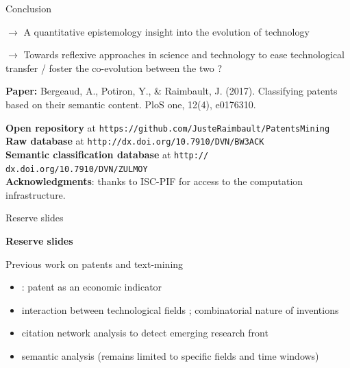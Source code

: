\documentclass{beamer}
\begin{document}
\begin{frame}{Conclusion}

$\rightarrow$ A quantitative epistemology insight into the evolution of technology

\medskip

$\rightarrow$ Towards reflexive approaches in science and technology to ease technological transfer / foster the co-evolution between the two ?


\bigskip


\textbf{Paper: } Bergeaud, A., Potiron, Y., \& Raimbault, J. (2017). Classifying patents based on their semantic content. PloS one, 12(4), e0176310.

\medskip
\textbf{Open repository} at \texttt{https://github.com/JusteRaimbault/PatentsMining}\\\medskip
\textbf{Raw database} at \texttt{http://dx.doi.org/10.7910/DVN/BW3ACK}\\\medskip 
\textbf{Semantic classification database} at  \texttt{http:// dx.doi.org/10.7910/DVN/ZULMOY}\\\medskip
\textbf{Acknowledgments}: thanks to ISC-PIF for access to the computation infrastructure.

\end{frame}


\begin{frame}{Reserve slides}
    
    \centering
    \Huge
    \textbf{Reserve slides}
    
\end{frame}

\begin{frame}{Previous work on patents and text-mining}

    \begin{itemize}
\item \cite{griliches1998patent}: patent as an economic indicator
\item \cite{Youn:2015fk} interaction between technological fields ; combinatorial nature of inventions
\item \cite{2016arXiv160207928B} citation network analysis to detect emerging research front
\item \cite{gerken2012new} \cite{tseng2007text} semantic analysis (remains limited to specific fields and time windows)
\end{itemize} 

\end{frame}
\end{document}
